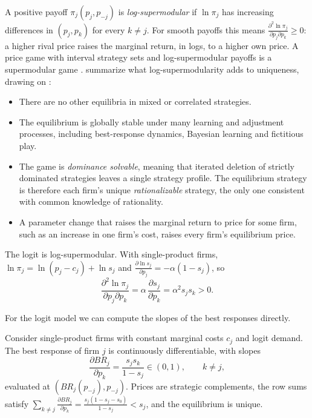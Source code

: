 A positive payoff $\pi_j(p_j, p_{-j})$ is \emph{log-supermodular} if $\ln\pi_j$ has increasing differences in
$(p_j, p_k)$ for every $k \neq j$. For smooth payoffs this means
$\frac{\partial^2\ln\pi_j}{\partial p_j\partial p_k} \ge 0$: a higher rival price raises the marginal return, in
logs, to a higher own price. A price game with interval strategy sets and log-supermodular payoffs is a
supermodular game \citep{MilgromRoberts1990,Vives1990}. \citet[p.~16]{CaplinNalebuff1991} summarize what
log-supermodularity adds to uniqueness, drawing on \citet{MilgromRoberts1990}:
\begin{itemize}
  \item There are no other equilibria in mixed or correlated strategies.
  \item The equilibrium is globally stable under many learning and adjustment processes, including best-response
  dynamics, Bayesian learning and fictitious play.
  \item The game is \emph{dominance solvable}, meaning that iterated deletion of strictly dominated strategies
  leaves a single strategy profile. The equilibrium strategy is therefore each firm's unique \emph{rationalizable}
  strategy, the only one consistent with common knowledge of rationality.
  \item A parameter change that raises the marginal return to price for some firm, such as an increase in one firm's
  cost, raises every firm's equilibrium price.
\end{itemize}
The logit is log-supermodular. With single-product firms, $\ln\pi_j = \ln(p_j - c_j) + \ln s_j$ and
$\frac{\partial\ln s_j}{\partial p_j} = -\alpha(1 - s_j)$, so
\[
  \frac{\partial^2\ln\pi_j}{\partial p_j\partial p_k} = \alpha\,\frac{\partial s_j}{\partial p_k} = \alpha^2 s_j s_k > 0.
\]

For the logit model we can compute the slopes of the best responses directly.

\begin{proposition}\label{prop:04-logit-br}
Consider single-product firms with constant marginal costs $c_j$ and logit demand. The best response of firm $j$
is continuously differentiable, with slopes
\begin{equation}\label{eq:04-logit-br-slope}
  \frac{\partial BR_j}{\partial p_k} = \frac{s_j s_k}{1 - s_j} \in (0, 1), \qquad k \neq j,
\end{equation}
evaluated at $(BR_j(p_{-j}), p_{-j})$. Prices are strategic complements, the row sums satisfy
$\sum_{k \neq j}\frac{\partial BR_j}{\partial p_k} = \frac{s_j(1 - s_j - s_0)}{1 - s_j} < s_j$, and the equilibrium is
unique.
\end{proposition}

